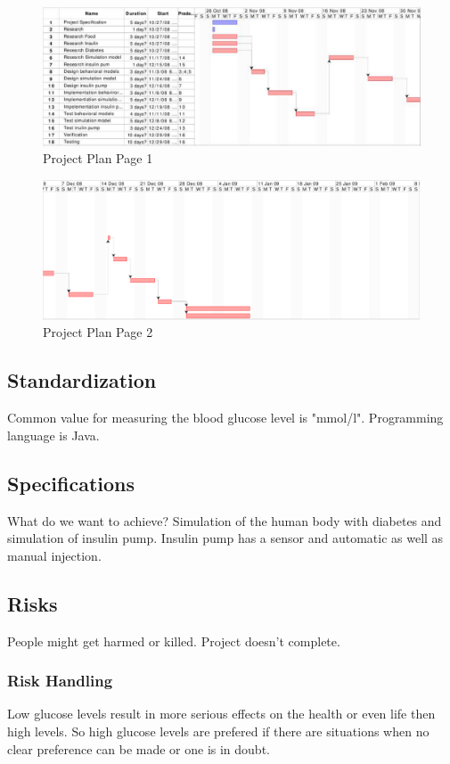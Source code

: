 \documentclass[pdflatex,a4paper,11pt,english]{scrreprt}
\begin{document}
\begin{figure}[htb]
\centering
\includegraphics[width=\textwidth]{images/projectplan_page1}
\caption{Project Plan Page 1}
\label{fig:projectplan1}
\end{figure}

\begin{figure}[htb]
\centering
\includegraphics[width=\textwidth]{images/projectplan_page2}
\caption{Project Plan Page 2}
\label{fig:projectplan2}
\end{figure}

\subsection{Standardization}
Common value for measuring the blood glucose level is "mmol/l".
Programming language is Java.

\subsection{Specifications}
What do we want to achieve?
Simulation of the human body with diabetes and simulation of insulin pump.
Insulin pump has a sensor and automatic as well as manual injection.

\subsection{Risks}
People might get harmed or killed.
Project doesn't complete.

\subsubsection{Risk Handling}
Low glucose levels result in more serious effects on the health or even life then high levels.
So high glucose levels are prefered if there are situations when no clear preference can be made or one is in doubt.
\end{document}
